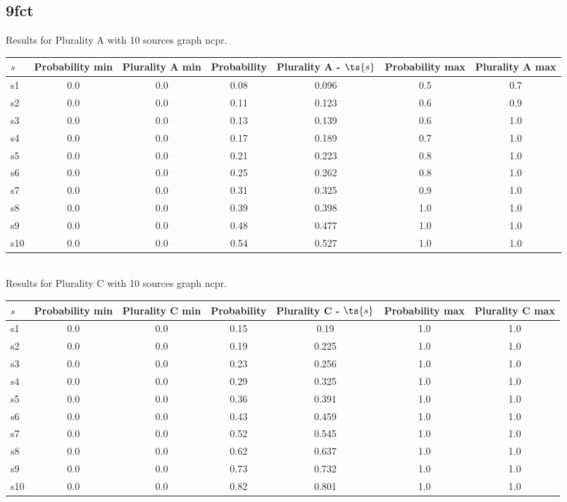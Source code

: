 \documentclass{article}
\begin{document}
\newpage

\subsection{9fct}

\noindent Results for Plurality A with 10 sources graph ncpr.

\noindent\begin{tabular}{|l|c|c|c|c|c|c|}
\hline
$s$& Probability min & Plurality A min & Probability & Plurality A - $\ts{s}$ & Probability max & Plurality A max\\
\hline
s1 &0.0 & 0.0 & 0.08 & 0.096 & 0.5 & 0.7\\
\hline
s2 &0.0 & 0.0 & 0.11 & 0.123 & 0.6 & 0.9\\
\hline
s3 &0.0 & 0.0 & 0.13 & 0.139 & 0.6 & 1.0\\
\hline
s4 &0.0 & 0.0 & 0.17 & 0.189 & 0.7 & 1.0\\
\hline
s5 &0.0 & 0.0 & 0.21 & 0.223 & 0.8 & 1.0\\
\hline
s6 &0.0 & 0.0 & 0.25 & 0.262 & 0.8 & 1.0\\
\hline
s7 &0.0 & 0.0 & 0.31 & 0.325 & 0.9 & 1.0\\
\hline
s8 &0.0 & 0.0 & 0.39 & 0.398 & 1.0 & 1.0\\
\hline
s9 &0.0 & 0.0 & 0.48 & 0.477 & 1.0 & 1.0\\
\hline
s10 &0.0 & 0.0 & 0.54 & 0.527 & 1.0 & 1.0\\
\hline
\end{tabular}\\

\noindent Results for Plurality C with 10 sources graph ncpr.

\noindent\begin{tabular}{|l|c|c|c|c|c|c|}
\hline
$s$& Probability min & Plurality C min & Probability & Plurality C - $\ts{s}$ & Probability max & Plurality C max\\
\hline
s1 &0.0 & 0.0 & 0.15 & 0.19 & 1.0 & 1.0\\
\hline
s2 &0.0 & 0.0 & 0.19 & 0.225 & 1.0 & 1.0\\
\hline
s3 &0.0 & 0.0 & 0.23 & 0.256 & 1.0 & 1.0\\
\hline
s4 &0.0 & 0.0 & 0.29 & 0.325 & 1.0 & 1.0\\
\hline
s5 &0.0 & 0.0 & 0.36 & 0.391 & 1.0 & 1.0\\
\hline
s6 &0.0 & 0.0 & 0.43 & 0.459 & 1.0 & 1.0\\
\hline
s7 &0.0 & 0.0 & 0.52 & 0.545 & 1.0 & 1.0\\
\hline
s8 &0.0 & 0.0 & 0.62 & 0.637 & 1.0 & 1.0\\
\hline
s9 &0.0 & 0.0 & 0.73 & 0.732 & 1.0 & 1.0\\
\hline
s10 &0.0 & 0.0 & 0.82 & 0.801 & 1.0 & 1.0\\
\hline
\end{tabular}\\
\end{document}
